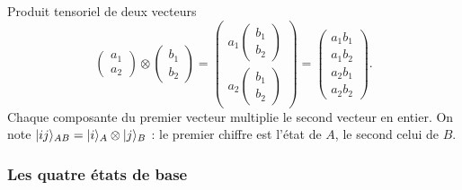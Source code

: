 \begin{definition}{Produit tensoriel de deux vecteurs}
\[
  \begin{pmatrix}a_1\\ a_2\end{pmatrix}\otimes\begin{pmatrix}b_1\\ b_2\end{pmatrix}
  =\begin{pmatrix}a_1\begin{pmatrix}b_1\\ b_2\end{pmatrix}\\[2ex]
                  a_2\begin{pmatrix}b_1\\ b_2\end{pmatrix}\end{pmatrix}
  =\begin{pmatrix}a_1b_1\\ a_1b_2\\ a_2b_1\\ a_2b_2\end{pmatrix}.
\]
Chaque composante du premier vecteur multiplie le second vecteur en entier. On note
$|ij\rangle_{AB}=|i\rangle_A\otimes|j\rangle_B$ : le premier chiffre est l'état de $A$, le second
celui de $B$.
\end{definition}

\subsubsection{Les quatre états de base}

